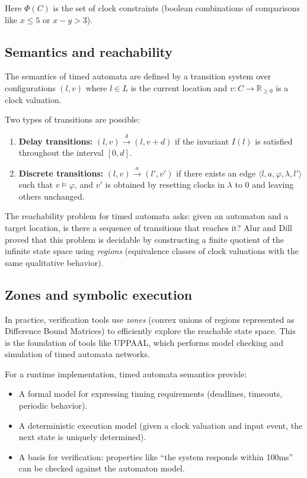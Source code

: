Here $\Phi(C)$ is the set of clock constraints (boolean combinations of comparisons like $x \le 5$ or $x - y > 3$).


\subsection{Semantics and reachability}

The semantics of timed automata are defined by a transition system over configurations $(l, v)$ where $l \in L$ is the current location and $v: C \rightarrow \mathbb{R}_{\ge 0}$ is a clock valuation.

Two types of transitions are possible:
\begin{enumerate}
  \item \textbf{Delay transitions:} $(l, v) \xrightarrow{d} (l, v+d)$ if the invariant $I(l)$ is satisfied throughout the interval $[0,d]$.
  \item \textbf{Discrete transitions:} $(l, v) \xrightarrow{a} (l', v')$ if there exists an edge $\langle l, a, \varphi, \lambda, l' \rangle$ such that $v \models \varphi$, and $v'$ is obtained by resetting clocks in $\lambda$ to 0 and leaving others unchanged.
\end{enumerate}

The reachability problem for timed automata asks: given an automaton and a target location, is there a sequence of transitions that reaches it?
Alur and Dill proved that this problem is decidable by constructing a finite quotient of the infinite state space using \emph{regions} (equivalence classes of clock valuations with the same qualitative behavior).

\subsection{Zones and symbolic execution}

In practice, verification tools use \emph{zones} (convex unions of regions represented as Difference Bound Matrices) to efficiently explore the reachable state space.
This is the foundation of tools like UPPAAL, which performs model checking and simulation of timed automata networks.

For a runtime implementation, timed automata semantics provide:
\begin{itemize}
  \item A formal model for expressing timing requirements (deadlines, timeouts, periodic behavior).
  \item A deterministic execution model (given a clock valuation and input event, the next state is uniquely determined).
  \item A basis for verification: properties like ``the system responds within 100ms'' can be checked against the automaton model.
\end{itemize}

